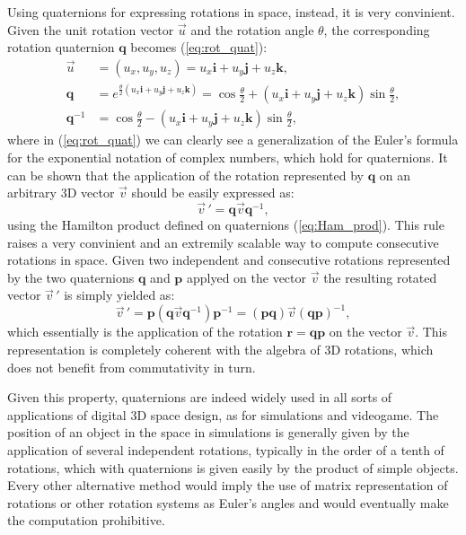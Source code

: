 Using quaternions for expressing rotations in space, instead, it is very convinient. Given the unit rotation vector $\vec u$ and the rotation angle $\theta$, the corresponding rotation quaternion $\bm{q}$ becomes (\ref{eq:rot_quat}):
\begin{align}
    \vec u & = (u_x, u_y, u_z) = u_x\bm{i} + u_y\bm{j} + u_z\bm{k}, \\
    \bm{q} & = e^{\frac{\theta}{2}(u_x\bm{i} + u_y\bm{j} + u_z\bm{k})} = \cos{\frac{\theta}{2}} + (u_x\bm{i} + u_y\bm{j} + u_z\bm{k})\sin{\frac{\theta}{2}}, \label{eq:rot_quat}\\
    \bm{q}^{-1} & = \cos{\frac{\theta}{2}} - (u_x\bm{i} + u_y\bm{j} + u_z\bm{k})\sin{\frac{\theta}{2}},
\end{align}
where in (\ref{eq:rot_quat}) we can clearly see a generalization of the Euler's formula for the exponential notation of complex numbers, which hold for quaternions. It can be shown that the application of the rotation represented by $\bm{q}$ on an arbitrary 3D vector $\vec v$ should be easily expressed as:
\begin{equation}
    \vec v\,' = \bm{q} \vec v \bm{q}^{-1},
\end{equation}
using the Hamilton product defined on quaternions (\ref{eq:Ham_prod}). This rule raises a very convinient and an extremily scalable way to compute consecutive rotations in space. Given two independent and consecutive rotations represented by the two quaternions $\bm{q}$ and $\bm{p}$ applyed on the vector $\vec v$ the resulting rotated vector $\vec v\,'$ is simply yielded as:
\begin{equation}
    \vec v\,' = \bm{p} ( \bm{q} \vec v \bm{q}^{-1} ) \bm{p}^{-1} = (\bm{p}\bm{q}) \vec v (\bm{q}\bm{p})^{-1},
\end{equation}
which essentially is the application of the rotation $\bm{r} = \bm{q}\bm{p}$ on the vector $\vec v$. This representation is completely coherent with the algebra of 3D rotations, which does not benefit from commutativity in turn.

Given this property, quaternions are indeed widely used in all sorts of applications of digital 3D space design, as for simulations and videogame. The position of an object in the space in simulations is generally given by the application of several independent rotations, typically in the order of a tenth of rotations, which with quaternions is given easily by the product of simple objects. Every other alternative method would imply the use of matrix representation of rotations or other rotation systems as Euler's angles and would eventually make the computation prohibitive.

